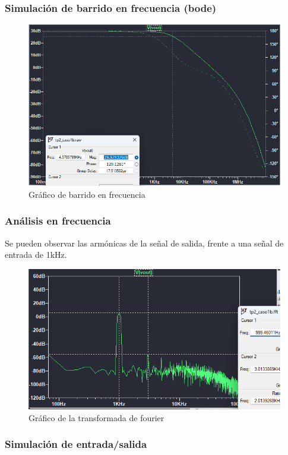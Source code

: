 \subsubsection{Simulación de barrido en frecuencia (bode)}
\begin{figure}[h!]
    \centering
    \includegraphics[width=0.80\linewidth]{img/bode.png}
    \caption{Gráfico de barrido en frecuencia}
    \label{fig:bode}
\end{figure}

\subsubsection{Análisis en frecuencia }

Se pueden observar las armónicas de la señal de salida, frente a una señal de entrada de 1kHz.
\begin{figure}[h!]
    \centering
    \includegraphics[width=0.80\linewidth]{img/ftt.png}
    \caption{Gráfico de la transformada de fourier}
    \label{fig:fft}
\end{figure}

\subsubsection{Simulación de entrada/salida}

